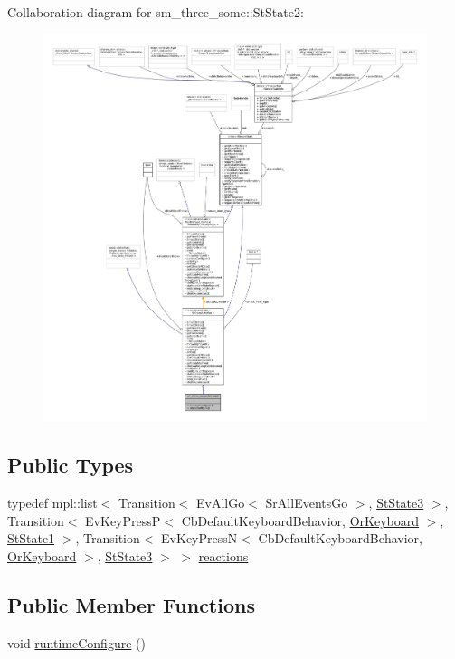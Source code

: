 Collaboration diagram for sm\+\_\+three\+\_\+some\+:\+:St\+State2\+:
\nopagebreak
\begin{figure}[H]
\begin{center}
\leavevmode
\includegraphics[width=350pt]{structsm__three__some_1_1StState2__coll__graph}
\end{center}
\end{figure}
\subsection*{Public Types}
\begin{DoxyCompactItemize}
\item 
typedef mpl\+::list$<$ Transition$<$ Ev\+All\+Go$<$ Sr\+All\+Events\+Go $>$, \hyperlink{structsm__three__some_1_1StState3}{St\+State3} $>$, Transition$<$ Ev\+Key\+PressP$<$ Cb\+Default\+Keyboard\+Behavior, \hyperlink{classsm__three__some_1_1OrKeyboard}{Or\+Keyboard} $>$, \hyperlink{structsm__three__some_1_1StState1}{St\+State1} $>$, Transition$<$ Ev\+Key\+PressN$<$ Cb\+Default\+Keyboard\+Behavior, \hyperlink{classsm__three__some_1_1OrKeyboard}{Or\+Keyboard} $>$, \hyperlink{structsm__three__some_1_1StState3}{St\+State3} $>$ $>$ \hyperlink{structsm__three__some_1_1StState2_ab4fa2f190482199ca04dd3aff5b90119}{reactions}
\end{DoxyCompactItemize}
\subsection*{Public Member Functions}
\begin{DoxyCompactItemize}
\item 
void \hyperlink{structsm__three__some_1_1StState2_aab0c27caa0d5a70c644ee1ec0830ba15}{runtime\+Configure} ()
\end{DoxyCompactItemize}
